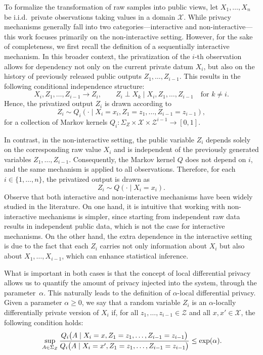 \documentclass[a4paper, 11pt]{article}
\theoremstyle{definition}
\begin{document}
{To formalize the transformation of raw samples into public views, let $X_1, \dots, X_n$ be i.i.d.\ private observations taking values in a domain $\mathcal{X}$.
While privacy mechanisms generally fall into two categories—interactive and non-interactive—this work focuses primarily on the non-interactive setting.
However, for the sake of completeness, we first recall the definition of a sequentially interactive mechanism. In this broader context, the privatization of the $i$-th observation allows for dependency not only on the current private datum $X_i$, but also on the history of previously released public outputs $Z_1, \dots, Z_{i-1}$. This results in the following conditional independence structure:
\[
X_i, Z_1, \dots, Z_{i-1} \rightarrow Z_i, \qquad Z_i \perp X_k \mid X_i, Z_1, \dots, Z_{i-1} \quad \text{for } k \neq i.
\]
Hence, the privatized output $Z_i$ is drawn according to
\[
Z_i \sim Q_i(\cdot \mid X_i = x_i, Z_1 = z_1, \dots, Z_{i-1} = z_{i-1}),
\]
for a collection of Markov kernels $Q_i : \Sigma_Z \times \mathcal{X} \times \mathcal{Z}^{i-1} \rightarrow [0,1]$.  

In contrast, in the non-interactive setting, the public variable $Z_i$ depends solely on the corresponding raw value $X_i$ and is independent of the previously generated variables $Z_1, \dots, Z_{i-1}$. Consequently, the Markov kernel $Q$ does not depend on $i$, and the same mechanism is applied to all observations. Therefore, for each $i \in \{1, \dots, n\}$, the privatized output is drawn as
\begin{equation}\label{eq: drawn Z nonint}
    Z_i \sim Q(\cdot \mid X_i = x_i).
\end{equation}
Observe that both interactive and non-interactive mechanisms have been widely studied in the literature. On one hand, it is intuitive that working with non-interactive mechanisms is simpler, since starting from independent raw data results in independent public data, which is not the case for interactive mechanisms. On the other hand, the extra dependence in the interactive setting is due to the fact that each $Z_i$ carries not only information about $X_i$ but also about $X_1, \dots, X_{i-1}$, which can enhance statistical inference.

What is important in both cases is that the concept of local differential privacy allows us to quantify the amount of privacy injected into the system, through the parameter~$\alpha$. This naturally leads to the definition of $\alpha$-local differential privacy. Given a parameter $\alpha \ge 0$, we say that a random variable $Z_i$ is an $\alpha$-locally differentially private version of $X_i$ if, for all $z_1, \dots, z_{i-1} \in \mathcal{Z}$ and all $x,x' \in \mathcal{X}$, the following condition holds:
\begin{equation}{\label{eq: def LDP1}}
\sup_{A \in \Sigma_Z} \frac{Q_i\bigl(A \mid X_i = x, Z_1 = z_1, \dots, Z_{i-1} = z_{i-1}\bigr)}
{Q_i\bigl(A \mid X_i = x', Z_1 = z_1, \dots, Z_{i-1} = z_{i-1}\bigr)}
\le \exp(\alpha).    
\end{equation}

}
\end{document}
